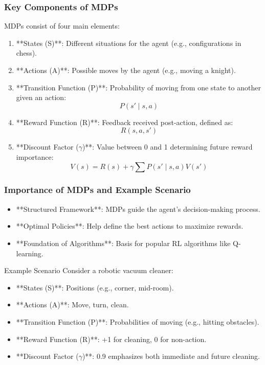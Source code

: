 \documentclass[aspectratio=169]{beamer}
\begin{document}
\begin{frame}[fragile]
    \frametitle{Key Components of MDPs}
    MDPs consist of four main elements:
    \begin{enumerate}
        \item **States (S)**: Different situations for the agent (e.g., configurations in chess).
        \item **Actions (A)**: Possible moves by the agent (e.g., moving a knight).
        \item **Transition Function (P)**: Probability of moving from one state to another given an action:
            \[
            P(s' \mid s, a)
            \]
        \item **Reward Function (R)**: Feedback received post-action, defined as:
            \[
            R(s, a, s')
            \]
        \item **Discount Factor ($\gamma$)**: Value between 0 and 1 determining future reward importance:
            \[
            V(s) = R(s) + \gamma \sum P(s' \mid s, a) V(s')
            \]
    \end{enumerate}
\end{frame}

\begin{frame}[fragile]
    \frametitle{Importance of MDPs and Example Scenario}
    \begin{itemize}
        \item **Structured Framework**: MDPs guide the agent's decision-making process.
        \item **Optimal Policies**: Help define the best actions to maximize rewards.
        \item **Foundation of Algorithms**: Basis for popular RL algorithms like Q-learning.
    \end{itemize}

    \begin{block}{Example Scenario}
        Consider a robotic vacuum cleaner:
        \begin{itemize}
            \item **States (S)**: Positions (e.g., corner, mid-room).
            \item **Actions (A)**: Move, turn, clean.
            \item **Transition Function (P)**: Probabilities of moving (e.g., hitting obstacles).
            \item **Reward Function (R)**: +1 for cleaning, 0 for non-action.
            \item **Discount Factor ($\gamma$)**: 0.9 emphasizes both immediate and future cleaning.
        \end{itemize}
    \end{block}
\end{frame}
\end{document}
